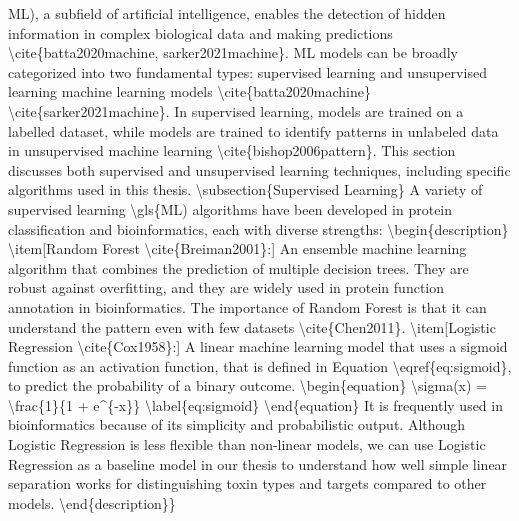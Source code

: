  \gls{ML), a subfield of artificial intelligence, enables the detection of hidden information in complex biological data and making predictions \cite{batta2020machine, sarker2021machine}.
ML models can be broadly categorized into two fundamental types: supervised learning and unsupervised learning machine learning models \cite{batta2020machine} \cite{sarker2021machine}.
In supervised learning, models are trained on a labelled dataset, while models are trained to identify patterns in unlabeled data in unsupervised machine learning \cite{bishop2006pattern}.
This section discusses both supervised and unsupervised learning techniques, including specific algorithms used in this thesis.



\subsection{Supervised Learning}

A variety of supervised learning \gls{ML) algorithms have been developed in protein classification and bioinformatics, each with diverse strengths:


\begin{description}
	\item[Random Forest  \cite{Breiman2001}:] An ensemble machine learning algorithm that combines the prediction of multiple decision trees. They are robust against overfitting, and they are widely used in protein function annotation in bioinformatics. The importance of Random Forest is that it can understand the pattern even with few datasets  \cite{Chen2011}.
	
	
	\item[Logistic Regression  \cite{Cox1958}:] A linear machine learning model that uses a sigmoid function as an activation function, that is defined in Equation \eqref{eq:sigmoid}, to predict the probability of a binary outcome.
	
	\begin{equation}
		\sigma(x) = \frac{1}{1 + e^{-x}}
		\label{eq:sigmoid}
	\end{equation}
	
	It is frequently used in bioinformatics because of its simplicity and probabilistic output.
	Although Logistic Regression is less flexible than non-linear models, we can use Logistic Regression as a baseline model in our thesis to understand how well simple linear separation works for distinguishing toxin types and targets compared to other models.
	

\end{description}}}

